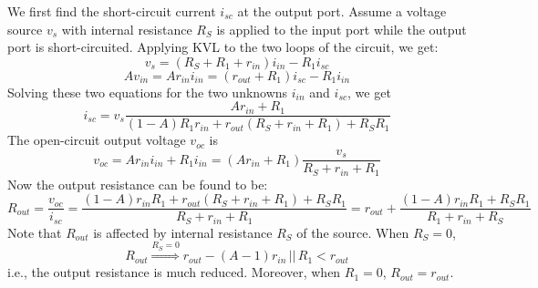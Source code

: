 \documentclass{article}
\begin{document}
\begin{itemize}
  We first find the short-circuit current $i_{sc}$ 
  at the output port. Assume a voltage source $v_s$ with internal resistance 
  $R_S$ is applied to the input port while the output port is short-circuited.
  Applying KVL to the two loops of the circuit, we get:
  \begin{equation} 
    v_s=(R_S+R_1+r_{in})i_{in}-R_1 i_{sc} 
  \end{equation}
  \begin{equation}
    A v_{in}=A r_{in} i_{in}=(r_{out}+R_1) i_{sc}-R_1 i_{in} 
  \end{equation}
  Solving these two equations for the two unknowns $i_{in}$ and $i_{sc}$, we get
  \begin{equation} 
    i_{sc}=v_s \frac{Ar_{in}+R_1}{(1-A)R_1 r_{in} +r_{out}(R_S+r_{in}+R_1)+R_SR_1} 
  \end{equation}
  The open-circuit output voltage $v_{oc}$ is 
  \begin{equation}
    v_{oc}=Ar_{in}i_{in}+R_1i_{in}=(Ar_{in}+R_1)\frac{v_s}{R_S+r_{in}+R_1} 
  \end{equation}
  Now the output resistance can be found to be:
  \begin{equation}
    R_{out}=\frac{v_{oc}}{i_{sc}}
    =\frac{(1-A)r_{in}R_1+r_{out}(R_S+r_{in}+R_1)+R_SR_1}{R_S+r_{in}+R_1}
    =r_{out}+\frac{(1-A) r_{in}R_1 +R_SR_1}{R_1+r_{in}+R_S}
  \end{equation}
  Note that $R_{out}$ is affected by internal resistance $R_S$ of the source.
  When $R_S=0$, 
  \begin{equation}
    R_{out}\stackrel{R_S=0}{\Longrightarrow} r_{out}-(A-1) r_{in}\,||\,R_1 < r_{out} 
  \end{equation}
  i.e., the output resistance is much reduced. Moreover, when $R_1=0$, 
  $R_{out}=r_{out}$.


\end{itemize}
\end{document}
